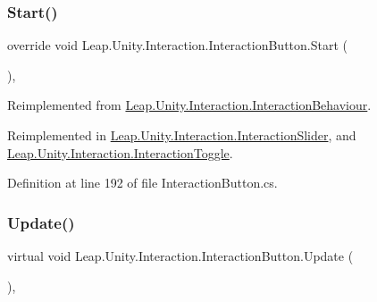\mbox{\label{class_leap_1_1_unity_1_1_interaction_1_1_interaction_button_a24a0efb036a0b9ac108e9bf1d5b9fb62}} 
\subsubsection{\texorpdfstring{Start()}{Start()}}
{\footnotesize\ttfamily override void Leap.\+Unity.\+Interaction.\+Interaction\+Button.\+Start (\begin{DoxyParamCaption}{ }\end{DoxyParamCaption})\hspace{0.3cm}{\ttfamily [protected]}, {\ttfamily [virtual]}}



Reimplemented from \mbox{\hyperlink{class_leap_1_1_unity_1_1_interaction_1_1_interaction_behaviour_ae5fabec0a3dbf845c0307b5eb813e993}{Leap.\+Unity.\+Interaction.\+Interaction\+Behaviour}}.



Reimplemented in \mbox{\hyperlink{class_leap_1_1_unity_1_1_interaction_1_1_interaction_slider_a7a15aed4a6f46dcf1b37ced85386b33b}{Leap.\+Unity.\+Interaction.\+Interaction\+Slider}}, and \mbox{\hyperlink{class_leap_1_1_unity_1_1_interaction_1_1_interaction_toggle_ab72d4861fbce848ae802d990917ee50e}{Leap.\+Unity.\+Interaction.\+Interaction\+Toggle}}.



Definition at line 192 of file Interaction\+Button.\+cs.

\mbox{\label{class_leap_1_1_unity_1_1_interaction_1_1_interaction_button_a9bd38d8e028c7e13684ed763e3e2830c}} 
\subsubsection{\texorpdfstring{Update()}{Update()}}
{\footnotesize\ttfamily virtual void Leap.\+Unity.\+Interaction.\+Interaction\+Button.\+Update (\begin{DoxyParamCaption}{ }\end{DoxyParamCaption})\hspace{0.3cm}{\ttfamily [protected]}, {\ttfamily [virtual]}}



